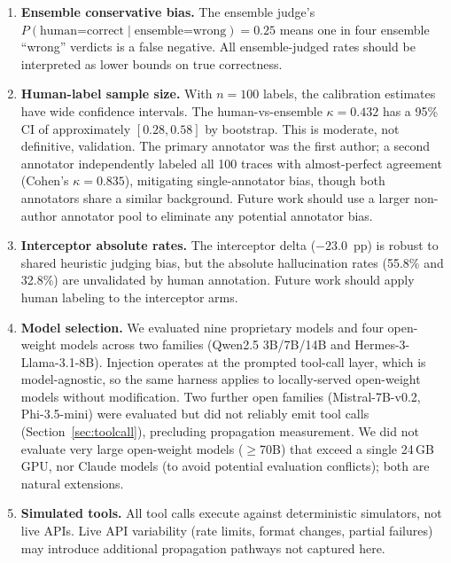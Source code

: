 \documentclass{ieeeaccess}
\begin{document}
\begin{enumerate}
  \item \textbf{Ensemble conservative bias.}
    The ensemble judge's $P(\text{human=correct} \mid
    \text{ensemble=wrong})=0.25$ means one in four ensemble ``wrong''
    verdicts is a false negative.
    All ensemble-judged rates should be interpreted as lower bounds on
    true correctness.

  \item \textbf{Human-label sample size.}
    With $n{=}100$ labels, the calibration estimates have wide confidence
    intervals.
    The human-vs-ensemble $\kappa{=}0.432$ has a 95\% CI of approximately
    $[0.28, 0.58]$ by bootstrap.
    This is moderate, not definitive, validation.
    The primary annotator was the first author; a second annotator
    independently labeled all 100 traces with almost-perfect agreement
    (Cohen's $\kappa{=}0.835$), mitigating single-annotator bias, though both
    annotators share a similar background.
    Future work should use a larger non-author annotator pool to
    eliminate any potential annotator bias.

  \item \textbf{Interceptor absolute rates.}
    The interceptor delta ($-23.0$~pp) is robust to shared heuristic
    judging bias, but the absolute hallucination rates (55.8\% and
    32.8\%) are unvalidated by human annotation.
    Future work should apply human labeling to the interceptor arms.

  \item \textbf{Model selection.}
    We evaluated nine proprietary models and four open-weight models across two
    families (Qwen2.5 3B/7B/14B and Hermes-3-Llama-3.1-8B). Injection operates
    at the prompted tool-call layer, which is model-agnostic, so the same
    harness applies to locally-served open-weight models without modification.
    Two further open families (Mistral-7B-v0.2, Phi-3.5-mini) were evaluated but
    did not reliably emit tool calls (Section~\ref{sec:toolcall}), precluding
    propagation measurement. We did not
    evaluate very large open-weight models ($\geq$70B) that exceed a single
    24\,GB GPU, nor Claude models (to avoid potential evaluation conflicts);
    both are natural extensions.

  \item \textbf{Simulated tools.}
    All tool calls execute against deterministic simulators, not live
    APIs.
    Live API variability (rate limits, format changes, partial failures)
    may introduce additional propagation pathways not captured here.


\end{enumerate}
\end{document}
